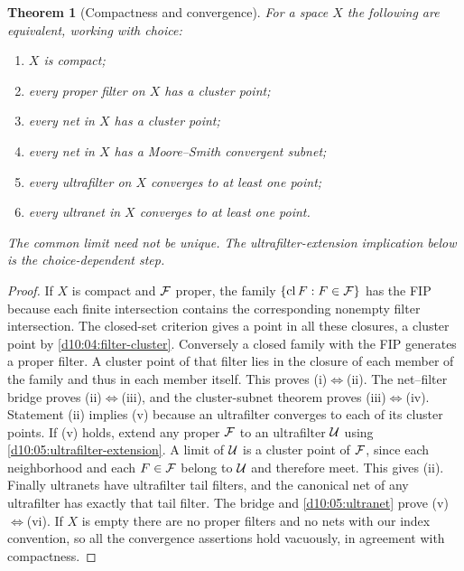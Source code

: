 \documentclass[11pt,oneside,openany]{book}
\newtheorem{theorem}{Theorem}[chapter]
\theoremstyle{definition}
\theoremstyle{remark}
\DeclareMathOperator{\cl}{cl}
\begin{document}
\begin{theorem}[Compactness and convergence]\label{d10:05:compact-convergence}
For a space $X$ the following are equivalent, working with choice:
\begin{enumerate}[label=(\roman*)]
\item $X$ is compact;
\item every proper filter on $X$ has a cluster point;
\item every net in $X$ has a cluster point;
\item every net in $X$ has a Moore--Smith convergent subnet;
\item every ultrafilter on $X$ converges to at least one point;
\item every ultranet in $X$ converges to at least one point.
\end{enumerate}
The common limit need not be unique. The ultrafilter-extension implication below is the choice-dependent step.
\end{theorem}
\begin{proof}
If $X$ is compact and $\mathcal F$ proper, the family $\{\cl F:F\in\FF\}$ has the FIP because each finite intersection contains the corresponding nonempty filter intersection. The closed-set criterion gives a point in all these closures, a cluster point by \cref{d10:04:filter-cluster}. Conversely a closed family with the FIP generates a proper filter. A cluster point of that filter lies in the closure of each member of the family and thus in each member itself. This proves (i)$\Leftrightarrow$(ii). The net--filter bridge proves (ii)$\Leftrightarrow$(iii), and the cluster-subnet theorem proves (iii)$\Leftrightarrow$(iv). Statement (ii) implies (v) because an ultrafilter converges to each of its cluster points. If (v) holds, extend any proper $\mathcal F$ to an ultrafilter $\mathcal U$ using \cref{d10:05:ultrafilter-extension}. A limit of $\mathcal U$ is a cluster point of $\mathcal F$, since each neighborhood and each $F\in\mathcal F$ belong to $\mathcal U$ and therefore meet. This gives (ii). Finally ultranets have ultrafilter tail filters, and the canonical net of any ultrafilter has exactly that tail filter. The bridge and \cref{d10:05:ultranet} prove (v)$\Leftrightarrow$(vi). If $X$ is empty there are no proper filters and no nets with our index convention, so all the convergence assertions hold vacuously, in agreement with compactness.
\end{proof}
\end{document}
